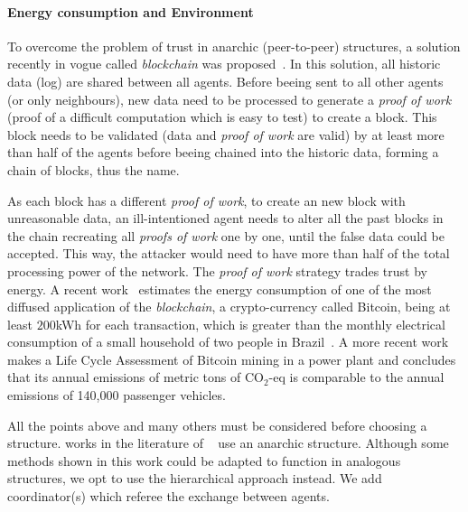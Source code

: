 \documentclass[../main.tex]{subfiles}
\begin{document}
\paragraph{Energy consumption and Environment}
To overcome the problem of trust in anarchic (peer-to-peer) structures, a solution recently in vogue called \emph{blockchain} was proposed~.
In this solution, all historic data (log) are shared between all agents.
Before beeing sent to all other agents (or only neighbours), new data need to be processed to generate a \emph{proof of work} (proof of a difficult computation which is easy to test) to create a block.
This block needs to be validated (data and \emph{proof of work} are valid) by at least more than half of the agents before beeing chained into the historic data, forming a chain of blocks, thus the name.

As each block has a different \emph{proof of work}, to create an new block with unreasonable data, an ill-intentioned agent needs to alter all the past blocks in the chain recreating all \emph{proofs of work} one by one, until the false data could be accepted.
This way, the attacker would need to have more than half of the total processing power of the network.
The \emph{proof of work} strategy trades trust by energy.
A recent work~\cite{ColeCheng2018} estimates the energy consumption of one of the most diffused application of the \emph{blockchain}, a crypto-currency called Bitcoin, being at least $200$kWh for each transaction, which is greater than the monthly electrical consumption of a small household of two people in Brazil~.
A more recent work~\cite{RoeckDrennen2022} makes a Life Cycle Assessment of Bitcoin mining in a power plant and concludes that its annual emissions of metric tons of CO$_2$-eq is comparable to the annual emissions of 140,000 passenger vehicles.

All the points above and many others must be considered before choosing a structure.
 works in the literature of \dmpc\ \cite{VelardeEtAl2017a, BoemEtAl2020, LiuEtAl2022} use an anarchic structure.
Although some methods shown in this work could be adapted to function in analogous structures, we opt to use the hierarchical approach instead. We add coordinator(s) which referee the exchange between agents.


\printbibliography
\end{document}
